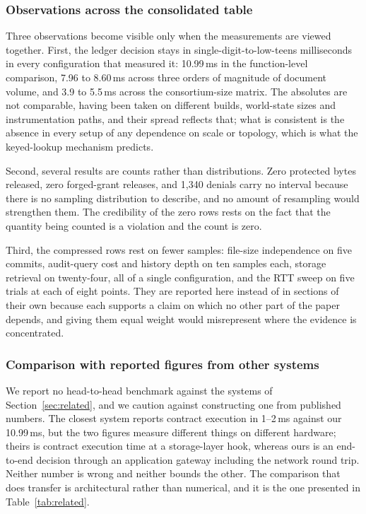 \documentclass[preprint,12pt]{elsarticle}
\begin{document}
\subsubsection*{Observations across the consolidated table}

Three observations become visible only when the measurements are viewed
together. First, the ledger decision stays in single-digit-to-low-teens
milliseconds in every configuration that measured it: 10.99\,ms in the
function-level comparison, 7.96 to 8.60\,ms across three orders of magnitude
of document volume, and 3.9 to 5.5\,ms across the consortium-size matrix.
The absolutes are not comparable, having been taken on different builds,
world-state sizes and instrumentation paths, and their spread reflects
that; what is consistent is the absence in every setup of any
dependence on scale or topology, which is what the keyed-lookup mechanism
predicts.

Second, several results are counts rather than distributions. Zero protected
bytes released, zero forged-grant releases, and 1{,}340 denials carry no
interval because there is no sampling distribution to describe, and no amount
of resampling would strengthen them. The credibility of the zero rows rests on
the fact that the quantity being counted is a violation and the count is zero.

Third, the compressed rows rest on fewer samples: file-size independence on
five commits, audit-query cost and history depth on ten samples each, storage
retrieval on twenty-four, all of a single configuration, and the RTT sweep on
five trials at each of eight points. They are reported here
instead of in sections of their own because each supports a claim on which no other part of the paper depends, and
giving them equal weight would misrepresent where the evidence is
concentrated.

\subsubsection*{Comparison with reported figures from other systems}

We report no head-to-head benchmark against the systems of
Section~\ref{sec:related}, and we caution against constructing one from
published numbers. The closest system reports contract execution in 1--2\,ms
against our 10.99\,ms, but the two figures measure different things on
different hardware; theirs is contract execution time at a storage-layer hook,
whereas ours is an end-to-end decision through an application gateway
including the network round trip. Neither number is wrong and neither bounds
the other. The comparison that does transfer is architectural rather than
numerical, and it is the one presented in Table~\ref{tab:related}.
\end{document}

